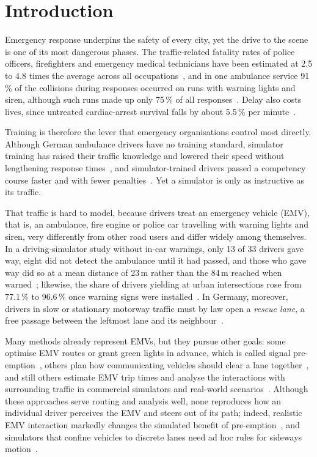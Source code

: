 \documentclass[conference,a4paper]{IEEEtran}
\begin{document}
\section{Introduction}
Emergency response underpins the safety of every city, yet the drive to the scene is one of its most dangerous phases. The traffic-related fatality rates of police officers, firefighters and emergency medical technicians have been estimated at 2.5 to 4.8 times the average across all occupations~\cite{hsiao18}, and in one ambulance service 91\,\% of the collisions during responses occurred on runs with warning lights and siren, although such runs made up only 75\,\% of all responses~\cite{custalow04}. Delay also costs lives, since untreated cardiac-arrest survival falls by about 5.5\,\% per minute~\cite{larsen93}.

Training is therefore the lever that emergency organisations control most directly. Although German ambulance drivers have no training standard, simulator training has raised their traffic knowledge and lowered their speed without lengthening response times~\cite{prohn20}, and simulator-trained drivers passed a competency course faster and with fewer penalties~\cite{lindsey08}. Yet a simulator is only as instructive as its traffic.

That traffic is hard to model, because drivers treat an emergency vehicle (EMV), that is, an ambulance, fire engine or police car travelling with warning lights and siren, very differently from other road users and differ widely among themselves. In a driving-simulator study without in-car warnings, only 13 of 33 drivers gave way, eight did not detect the ambulance until it had passed, and those who gave way did so at a mean distance of 23\,m rather than the 84\,m reached when warned~\cite{lidestam20}; likewise, the share of drivers yielding at urban intersections rose from 77.1\,\% to 96.6\,\% once warning signs were installed~\cite{savolainen10}. In Germany, moreover, drivers in slow or stationary motorway traffic must by law open a \emph{rescue lane}, a free passage between the leftmost lane and its neighbour~\cite{stvo11}.

Many methods already represent EMVs, but they pursue other goals: some optimise EMV routes or grant green lights in advance, which is called signal pre-emption~\cite{humagain20,su23}, others plan how communicating vehicles should clear a lane together~\cite{wu20,hannoun19}, and still others estimate EMV trip times and analyse the interactions with surrounding traffic in commercial simulators and real-world scenarios~\cite{cortes23}. Although these approaches serve routing and analysis well, none reproduces how an individual driver perceives the EMV and steers out of its path; indeed, realistic EMV interaction markedly changes the simulated benefit of pre-emption~\cite{kumar24}, and simulators that confine vehicles to discrete lanes need ad hoc rules for sideways motion~\cite{delpiano20}.
\end{document}
